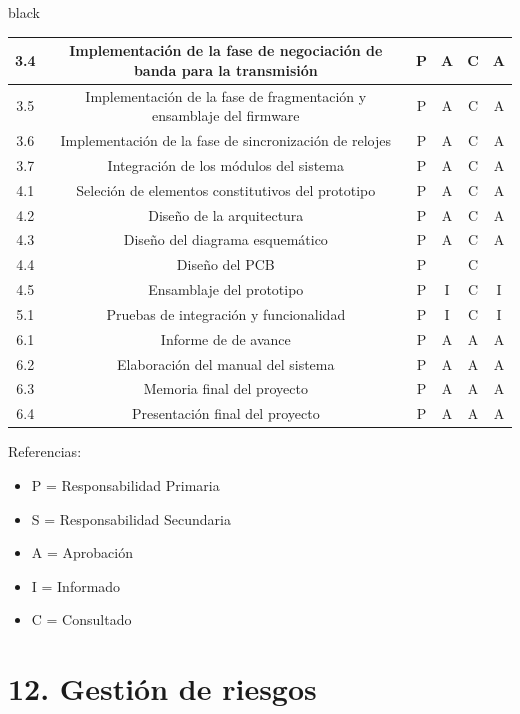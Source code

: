 \documentclass[11pt]{charter}
\begin{document}
\begin{consigna}{black}
\begin{table}[htpb]
{\begin{tabular}{|c|c|c|c|c|c|}
 3.4 & Implementación de la fase de negociación de banda para la transmisión & P & A & C & A \\ \hline
 3.5 & Implementación de la fase de fragmentación y ensamblaje del firmware & P & A & C & A \\ \hline
 3.6 & Implementación de la fase de sincronización de relojes & P & A & C & A \\ \hline
 3.7 & Integración de los módulos del sistema & P & A & C & A \\ \hline
 4.1 & Seleción de elementos constitutivos del prototipo & P & A & C & A \\ \hline
 4.2 & Diseño de la arquitectura & P & A & C & A \\ \hline
 4.3 & Diseño del diagrama esquemático & P & A & C & A \\ \hline
 4.4 & Diseño del PCB & P &  & C &  \\ \hline
 4.5 & Ensamblaje del prototipo & P & I & C & I \\ \hline
 5.1 & Pruebas de integración y funcionalidad & P & I & C & I \\ \hline
 6.1 & Informe de de avance & P & A & A & A \\ \hline
 6.2 & Elaboración del manual del sistema & P & A & A & A \\ \hline
 6.3 & Memoria final del proyecto & P & A & A & A \\ \hline
 6.4 & Presentación final del proyecto & P & A & A & A \\ \hline
\end{tabular}%
}
\end{table}

{\footnotesize
Referencias:
\begin{itemize}
	\item P = Responsabilidad Primaria
	\item S = Responsabilidad Secundaria
	\item A = Aprobación
	\item I = Informado
	\item C = Consultado
\end{itemize}
} %
\end{consigna}

\section{12. Gestión de riesgos}
\label{sec:riesgos}
\end{document}
